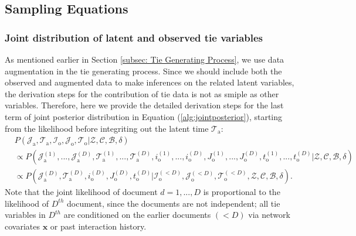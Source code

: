\documentclass[a4paper]{article}
\begin{document}
  	  \subsection{Sampling Equations}\label{subsec:Sampling Equations}
  	     \subsubsection{Joint distribution of latent and observed tie variables}\label{subsubsec:Joint distribution of Tie}
  	       As mentioned earlier in Section \ref{subsec: Tie Generating Process}, we use data augmentation in the tie generating process. Since we should include both the observed and augmented data to make inferences on the related latent variables, the derivation steps for the contribution of tie data is not as smiple as other variables. Therefore, here we provide the detailed derivation steps for the last term of joint posterior distribution in Equation (\ref{alg:jointposterior}), starting from the likelihood before integriting out the latent time $\mathcal{T}_{\mbox{a}}$: 
  	       \begin{equation}
  	       \begin{aligned}
  	       &P(\mathcal{J}_{\mbox{a}}, \mathcal{T}_{\mbox{a}},\mathcal{I}_{\mbox{o}}, \mathcal{J}_{\mbox{o}}, \mathcal{T}_{\mbox{o}} |\mathcal{Z}, \mathcal{C}, \mathcal{B}, \delta)
  	       \\& \propto P(\mathcal{J}^{(1)}_{\mbox{a}}, ...,\mathcal{J}^{(D)}_{\mbox{a}}, \mathcal{T}^{(1)}_{\mbox{a}},...,\mathcal{T}^{(D)}_{\mbox{a}}, i^{(1)}_{\mbox{o}},...,i^{(D)}_{\mbox{o}}, J^{(1)}_{\mbox{o}},...,J^{(D)}_{\mbox{o}}, t^{(1)}_{\mbox{o}},...,t^{(D)}_{\mbox{o}} |\mathcal{Z}, \mathcal{C}, \mathcal{B}, \delta)
  	       \\& \propto P(\mathcal{J}^{(D)}_{\mbox{a}}, \mathcal{T}^{(D)}_{\mbox{a}}, i^{(D)}_{\mbox{o}}, J^{(D)}_{\mbox{o}}, t^{(D)}_{\mbox{o}} |\mathcal{I}^{(<D)}_{\mbox{o}}, \mathcal{J}^{(<D)}_{\mbox{o}}, \mathcal{T}^{(<D)}_{\mbox{o}},\mathcal{Z}, \mathcal{C}, \mathcal{B}, \delta).
  	       \end{aligned}
  	       \end{equation}
  	       Note that the joint likelihood of document $d=1,...,D$ is proportional to the likelihood of $D^{th}$ document, since the documents are not independent; all tie variables in $D^{th}$ are conditioned on the earlier documents $(<D)$ via network covariates $\boldsymbol{x}$ or past interaction history. \\ \newline
\end{document}
